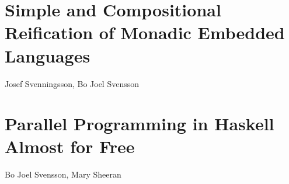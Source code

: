 \documentclass[a4paper]{book}
\begin{document}


% 
\cleardoublepage 


\section{Simple and Compositional Reification of Monadic Embedded Languages}

\begin{center} 
Josef Svenningsson, Bo Joel Svensson
\end{center}




% 
\cleardoublepage 


\section{Parallel Programming in Haskell Almost for Free}

\begin{center} 
Bo Joel Svensson, Mary Sheeran
\end{center}





\cleardoublepage
\end{document}
